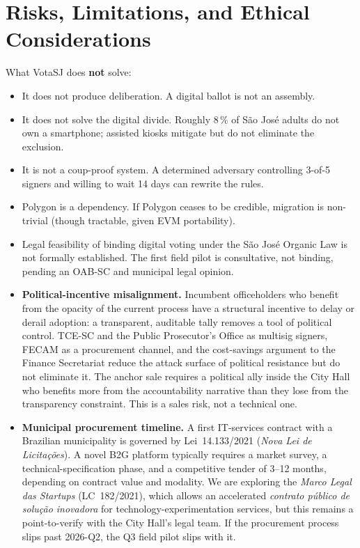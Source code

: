 \documentclass[12pt]{article}
\begin{document}
\section{Risks, Limitations, and Ethical Considerations}
\label{sec:risks}

What VotaSJ does \textbf{not} solve:

\begin{itemize}
  \item It does not produce deliberation. A digital ballot is not an assembly.
  \item It does not solve the digital divide. Roughly 8\,\% of S\~ao Jos\'e
        adults do not own a smartphone; assisted kiosks mitigate but do not
        eliminate the exclusion.
  \item It is not a coup-proof system. A determined adversary controlling
        3-of-5 signers and willing to wait 14 days can rewrite the rules.
  \item Polygon is a dependency. If Polygon ceases to be credible, migration
        is non-trivial (though tractable, given EVM portability).
  \item Legal feasibility of binding digital voting under the S\~ao Jos\'e
        Organic Law is not formally established. The first field pilot is
        consultative, not binding, pending an OAB-SC and municipal legal
        opinion.
  \item \textbf{Political-incentive misalignment.} Incumbent officeholders
        who benefit from the opacity of the current process have a structural
        incentive to delay or derail adoption: a transparent, auditable tally
        removes a tool of political control. TCE-SC and the Public
        Prosecutor's Office as multisig signers, FECAM as a procurement
        channel, and the cost-savings argument to the Finance Secretariat
        reduce the attack surface of political resistance but do not eliminate
        it. The anchor sale requires a political ally inside the City Hall who
        benefits more from the accountability narrative than they lose from
        the transparency constraint. This is a sales risk, not a technical
        one.
  \item \textbf{Municipal procurement timeline.} A first IT-services contract
        with a Brazilian municipality is governed by Lei~14.133/2021
        (\emph{Nova Lei de Licita\c{c}\~oes}). A novel B2G platform typically
        requires a market survey, a technical-specification phase, and a
        competitive tender of 3--12 months, depending on contract value and
        modality. We are exploring the \emph{Marco Legal das Startups}
        (LC~182/2021), which allows an accelerated \emph{contrato p\'ublico
        de solu\c{c}\~ao inovadora} for technology-experimentation services,
        but this remains a point-to-verify with the City Hall's legal team.
        If the procurement process slips past 2026-Q2, the Q3 field pilot
        slips with it.
\end{itemize}
\end{document}
